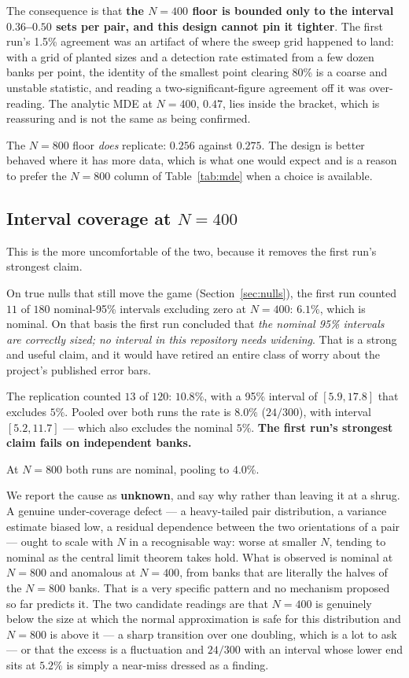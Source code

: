 \documentclass[11pt]{article}
\begin{document}
The consequence is that \textbf{the $N=400$ floor is bounded only to the interval
$0.36$--$0.50$ sets per pair, and this design cannot pin it tighter}. The first run's 1.5\%
agreement was an artifact of where the sweep grid happened to land: with a grid of planted sizes and
a detection rate estimated from a few dozen banks per point, the identity of the smallest point
clearing 80\% is a coarse and unstable statistic, and reading a two-significant-figure agreement off
it was over-reading. The analytic MDE at $N=400$, $0.47$, lies inside the bracket, which is
reassuring and is not the same as being confirmed.

The $N=800$ floor \emph{does} replicate: $0.256$ against $0.275$. The design is better behaved where
it has more data, which is what one would expect and is a reason to prefer the $N=800$ column of
Table~\ref{tab:mde} when a choice is available.

\subsection{Interval coverage at \texorpdfstring{$N=400$}{N=400}}
\label{sec:coverage}

This is the more uncomfortable of the two, because it removes the first run's strongest claim.

On true nulls that still move the game (Section~\ref{sec:nulls}), the first run counted $11$ of
$180$ nominal-95\% intervals excluding zero at $N=400$: $6.1\%$, which is nominal. On that basis the
first run concluded that \emph{the nominal 95\% intervals are correctly sized; no interval in this
repository needs widening}. That is a strong and useful claim, and it would have retired an entire
class of worry about the project's published error bars.

The replication counted $13$ of $120$: $10.8\%$, with a 95\% interval of $[5.9, 17.8]$ that excludes
$5\%$. Pooled over both runs the rate is $\mathbf{8.0\%}$ ($24/300$), with interval
$[\mathbf{5.2}, \mathbf{11.7}]$ --- which also excludes the nominal $5\%$. \textbf{The first run's
strongest claim fails on independent banks.}

At $N=800$ both runs are nominal, pooling to $4.0\%$.

We report the cause as \textbf{unknown}, and say why rather than leaving it at a shrug. A genuine
under-coverage defect --- a heavy-tailed pair distribution, a variance estimate biased low, a
residual dependence between the two orientations of a pair --- ought to scale with $N$ in a
recognisable way: worse at smaller $N$, tending to nominal as the central limit theorem takes hold.
What is observed is nominal at $N=800$ and anomalous at $N=400$, from banks that are literally the
halves of the $N=800$ banks. That is a very specific pattern and no mechanism proposed so far
predicts it. The two candidate readings are that $N=400$ is genuinely below the size at which the
normal approximation is safe for this distribution and $N=800$ is above it --- a sharp transition
over one doubling, which is a lot to ask --- or that the excess is a fluctuation and $24/300$ with an
interval whose lower end sits at $5.2\%$ is simply a near-miss dressed as a finding.
\end{document}
